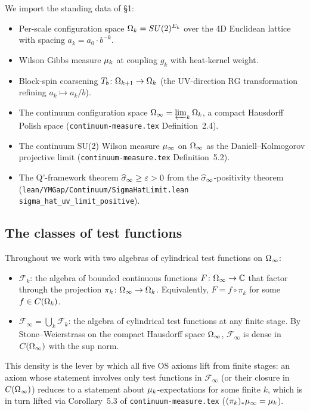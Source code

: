 We import the standing data of 
\S1:
\begin{itemize}
  \item Per-scale configuration space $\Omega_k = SU(2)^{E_k}$ over the
    4D Euclidean lattice with spacing $a_k = a_0 \cdot b^{-k}$.
  \item Wilson Gibbs measure $\mu_k$ at coupling $g_k$ with heat-kernel
    weight.
  \item Block-spin coarsening $T_b \colon \Omega_{k+1} \to \Omega_k$ (the
    UV-direction RG transformation refining $a_k \mapsto a_k/b$).
  \item The continuum configuration space
    $\Omega_\infty = \varprojlim_k \Omega_k$, a compact Hausdorff Polish space
    (\texttt{continuum-measure.tex} Definition~2.4).
  \item The continuum SU(2) Wilson measure $\mu_\infty$ on $\Omega_\infty$ as
    the Daniell--Kolmogorov projective limit
    (\texttt{continuum-measure.tex} Definition~5.2).
  \item The Q'-framework theorem $\widehat{\sigma}_\infty \ge \varepsilon > 0$ from
    the $\widehat{\sigma}_\infty$-positivity theorem (\texttt{lean/YMGap/Continuum/SigmaHatLimit.lean}
    \texttt{sigma\_hat\_uv\_limit\_positive}).
\end{itemize}

\subsection{The classes of test functions}
\label{subsec:test-functions}

Throughout we work with two algebras of cylindrical test functions on
$\Omega_\infty$:
\begin{itemize}
  \item $\mathcal{F}_k$: the algebra of bounded continuous functions
    $F \colon \Omega_\infty \to \mathbb{C}$ that factor through the projection
    $\pi_k \colon \Omega_\infty \to \Omega_k$.  Equivalently, $F = f \circ \pi_k$
    for some $f \in C(\Omega_k)$.
  \item $\mathcal{F}_\infty = \bigcup_k \mathcal{F}_k$: the algebra of
    cylindrical test functions at any finite stage.  By
    Stone--Weierstrass on the compact Hausdorff space $\Omega_\infty$,
    $\mathcal{F}_\infty$ is dense in $C(\Omega_\infty)$ with the sup norm.
\end{itemize}

This density is the lever by which all five OS axioms lift from finite
stages: an axiom whose statement involves only test functions in
$\mathcal{F}_\infty$ (or their closure in $C(\Omega_\infty)$) reduces to a
statement about $\mu_k$-expectations for some finite $k$, which is in
turn lifted via Corollary~5.3 of \texttt{continuum-measure.tex}
($(\pi_k)_* \mu_\infty = \mu_k$).

